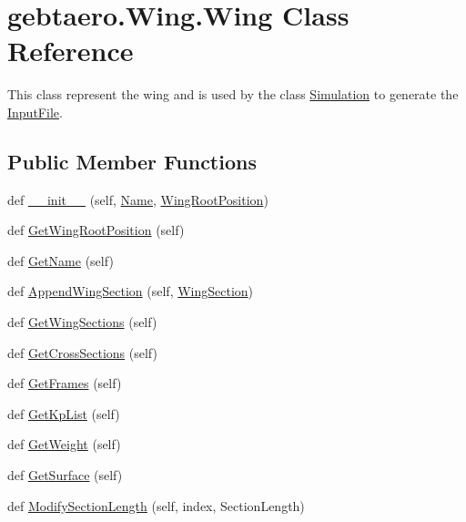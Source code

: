 \hypertarget{classgebtaero_1_1_wing_1_1_wing}{}\section{gebtaero.\+Wing.\+Wing Class Reference}
\label{classgebtaero_1_1_wing_1_1_wing}


This class represent the wing and is used by the class \hyperlink{namespacegebtaero_1_1_simulation}{Simulation} to generate the \hyperlink{namespacegebtaero_1_1_input_file}{Input\+File}.  


\subsection*{Public Member Functions}
\begin{DoxyCompactItemize}
\item 
def \hyperlink{classgebtaero_1_1_wing_1_1_wing_ad4899077f16bf8b8dff5e9ce86c4b2c0}{\+\_\+\+\_\+init\+\_\+\+\_\+} (self, \hyperlink{classgebtaero_1_1_wing_1_1_wing_a1c41ea89cf72ec60090134497f1ede15}{Name}, \hyperlink{classgebtaero_1_1_wing_1_1_wing_aa0957399544603f1df3cdb3b02eeda4a}{Wing\+Root\+Position})
\item 
def \hyperlink{classgebtaero_1_1_wing_1_1_wing_a6623e4ea917c8a03a3de9bbf7110e754}{Get\+Wing\+Root\+Position} (self)
\item 
def \hyperlink{classgebtaero_1_1_wing_1_1_wing_a180f53c7c326569cc0c8e8c78a3a0b2a}{Get\+Name} (self)
\item 
def \hyperlink{classgebtaero_1_1_wing_1_1_wing_ae2bcf197a55c10900d837bc0d9d6aac7}{Append\+Wing\+Section} (self, \hyperlink{classgebtaero_1_1_wing_section_1_1_wing_section}{Wing\+Section})
\item 
def \hyperlink{classgebtaero_1_1_wing_1_1_wing_a9fbfa35745a94279f37ebf497a36126e}{Get\+Wing\+Sections} (self)
\item 
def \hyperlink{classgebtaero_1_1_wing_1_1_wing_a15245b467e6be2a7ace9a917e67661ff}{Get\+Cross\+Sections} (self)
\item 
def \hyperlink{classgebtaero_1_1_wing_1_1_wing_a0bd0def91e16cd1a19b10fcdf8c50e41}{Get\+Frames} (self)
\item 
def \hyperlink{classgebtaero_1_1_wing_1_1_wing_afe768db8f9a06bd5784143c1168a5acc}{Get\+Kp\+List} (self)
\item 
def \hyperlink{classgebtaero_1_1_wing_1_1_wing_a290d5e1d3a18de515339ffbed0f0df35}{Get\+Weight} (self)
\item 
def \hyperlink{classgebtaero_1_1_wing_1_1_wing_af0be9af67eb300ebc83262025f6c80af}{Get\+Surface} (self)
\item 
def \hyperlink{classgebtaero_1_1_wing_1_1_wing_a3b5df3a1833448d36becf9a5a9f3e951}{Modify\+Section\+Length} (self, index, Section\+Length)
\end{DoxyCompactItemize}
